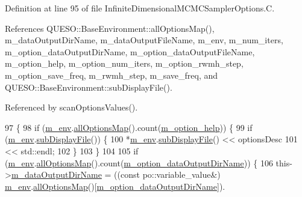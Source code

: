 Definition at line 95 of file Infinite\-Dimensional\-M\-C\-M\-C\-Sampler\-Options.\-C.



References Q\-U\-E\-S\-O\-::\-Base\-Environment\-::all\-Options\-Map(), m\-\_\-data\-Output\-Dir\-Name, m\-\_\-data\-Output\-File\-Name, m\-\_\-env, m\-\_\-num\-\_\-iters, m\-\_\-option\-\_\-data\-Output\-Dir\-Name, m\-\_\-option\-\_\-data\-Output\-File\-Name, m\-\_\-option\-\_\-help, m\-\_\-option\-\_\-num\-\_\-iters, m\-\_\-option\-\_\-rwmh\-\_\-step, m\-\_\-option\-\_\-save\-\_\-freq, m\-\_\-rwmh\-\_\-step, m\-\_\-save\-\_\-freq, and Q\-U\-E\-S\-O\-::\-Base\-Environment\-::sub\-Display\-File().



Referenced by scan\-Options\-Values().


\begin{DoxyCode}
97 \{
98   \textcolor{keywordflow}{if} (\hyperlink{class_q_u_e_s_o_1_1_infinite_dimensional_m_c_m_c_sampler_options_a798627198e7d75723bd48d123835503c}{m\_env}.\hyperlink{class_q_u_e_s_o_1_1_base_environment_ae7cee155956e0e70112f45e2ad1f02c8}{allOptionsMap}().count(\hyperlink{class_q_u_e_s_o_1_1_infinite_dimensional_m_c_m_c_sampler_options_a897fdd1438ecdd2cd9efe5b1abad55ba}{m\_option\_help})) \{
99     \textcolor{keywordflow}{if} (\hyperlink{class_q_u_e_s_o_1_1_infinite_dimensional_m_c_m_c_sampler_options_a798627198e7d75723bd48d123835503c}{m\_env}.\hyperlink{class_q_u_e_s_o_1_1_base_environment_a8a0064746ae8dddfece4229b9ad374d6}{subDisplayFile}()) \{
100       *\hyperlink{class_q_u_e_s_o_1_1_infinite_dimensional_m_c_m_c_sampler_options_a798627198e7d75723bd48d123835503c}{m\_env}.\hyperlink{class_q_u_e_s_o_1_1_base_environment_a8a0064746ae8dddfece4229b9ad374d6}{subDisplayFile}() << optionsDesc
101                               << std::endl;
102     \}
103   \}
104 
105   \textcolor{keywordflow}{if} (\hyperlink{class_q_u_e_s_o_1_1_infinite_dimensional_m_c_m_c_sampler_options_a798627198e7d75723bd48d123835503c}{m\_env}.\hyperlink{class_q_u_e_s_o_1_1_base_environment_ae7cee155956e0e70112f45e2ad1f02c8}{allOptionsMap}().count(\hyperlink{class_q_u_e_s_o_1_1_infinite_dimensional_m_c_m_c_sampler_options_a75dac93b87f4e93ffef95b35c7382ad2}{m\_option\_dataOutputDirName})) 
      \{
106     this->\hyperlink{class_q_u_e_s_o_1_1_infinite_dimensional_m_c_m_c_sampler_options_a224d09b8aa3f31aa2134338ae2a60018}{m\_dataOutputDirName} = ((\textcolor{keyword}{const} po::variable\_value&) 
      \hyperlink{class_q_u_e_s_o_1_1_infinite_dimensional_m_c_m_c_sampler_options_a798627198e7d75723bd48d123835503c}{m\_env}.\hyperlink{class_q_u_e_s_o_1_1_base_environment_ae7cee155956e0e70112f45e2ad1f02c8}{allOptionsMap}()[\hyperlink{class_q_u_e_s_o_1_1_infinite_dimensional_m_c_m_c_sampler_options_a75dac93b87f4e93ffef95b35c7382ad2}{m\_option\_dataOutputDirName}]).

\end{DoxyCode}
